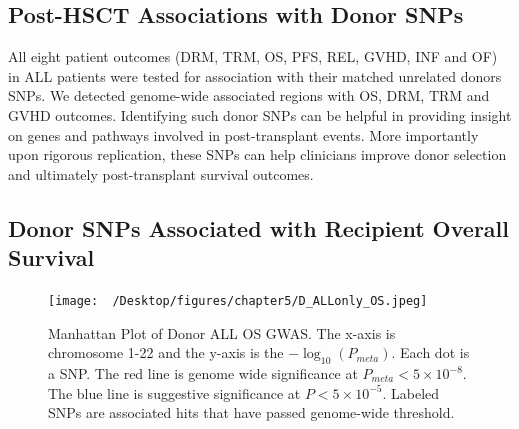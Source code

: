 \documentclass[]{DissertateOSU}
\begin{document}
\subsection{Post-HSCT Associations with Donor
SNPs}\label{post-hsct-associations-with-donor-snps}

All eight patient outcomes (DRM, TRM, OS, PFS, REL, GVHD, INF and OF) in
ALL patients were tested for association with their matched unrelated
donors SNPs. We detected genome-wide associated regions with OS, DRM,
TRM and GVHD outcomes. Identifying such donor SNPs can be helpful in
providing insight on genes and pathways involved in post-transplant
events. More importantly upon rigorous replication, these SNPs can help
clinicians improve donor selection and ultimately post-transplant
survival outcomes.

\subsection{Donor SNPs Associated with Recipient Overall
Survival}\label{donor-snps-associated-with-recipient-overall-survival}

\begin{figure}
    \centering
    \texttt{[image: ~/Desktop/figures/chapter5/D\_ALLonly\_OS.jpeg]}
    \caption[Manhattan Plot of Donor ALL OS GWAS.]{Manhattan Plot of Donor ALL OS GWAS. The x-axis is chromosome 1-22 and the y-axis is the $-\log_{10}(P_{meta})$. Each dot is a SNP. The red line is genome wide significance at $P_{meta} < 5\times{10}^{-8}$. The blue line is suggestive significance at $P < 5\times{10}^{-5}$. Labeled SNPs are associated hits that have passed genome-wide threshold.}
    \label{fig:d_os_1y}  
\end{figure}

\end{document}
